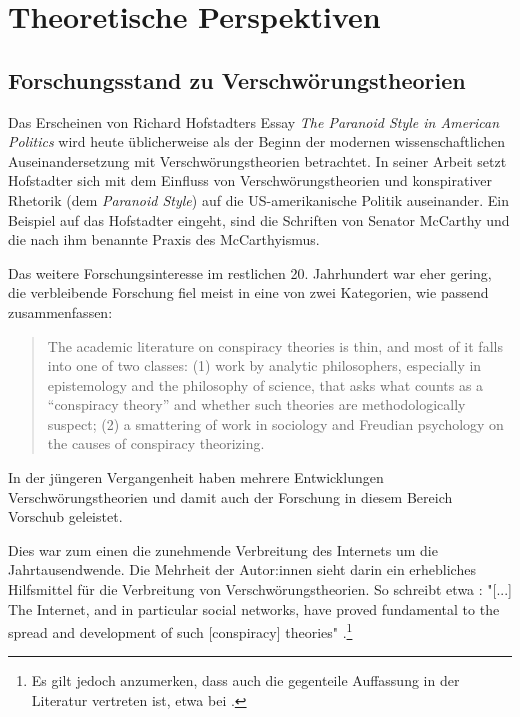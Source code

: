 \section{Theoretische Perspektiven}

\subsection{Forschungsstand zu Verschwörungstheorien}

Das Erscheinen von Richard Hofstadters Essay \textit{The Paranoid Style in American Politics} \parencite[][]{hofstadter_2008} wird heute üblicherweise als der Beginn der modernen wissenschaftlichen Auseinandersetzung mit Verschwörungstheorien betrachtet.
In seiner Arbeit setzt Hofstadter sich mit dem Einfluss von Verschwörungstheorien und konspirativer Rhetorik (dem \textit{Paranoid Style}) auf die US-amerikanische Politik auseinander.
Ein Beispiel auf das Hofstadter eingeht, sind die Schriften von Senator McCarthy und die nach ihm benannte Praxis des McCarthyismus.

Das weitere Forschungsinteresse im restlichen 20. Jahrhundert war eher gering, die verbleibende Forschung fiel meist in eine von zwei Kategorien, wie \textcite{sunstein_2008} passend zusammenfassen:

\begin{quotation}
    The academic literature on conspiracy theories is thin, and most of it falls into one 
    of two classes: (1) work by analytic philosophers, especially in epistemology and the 
    philosophy of science, that asks what counts as a “conspiracy theory” and whether such theories are methodologically suspect; (2) a smattering of work in sociology and Freudian psychology on the causes of conspiracy theorizing. \parencite[][2]{sunstein_2008}
\end{quotation}

In der jüngeren Vergangenheit haben mehrere Entwicklungen Verschwörungstheorien und damit auch der Forschung in diesem Bereich Vorschub geleistet.

Dies war zum einen die zunehmende Verbreitung des Internets um die Jahrtausendwende.
Die Mehrheit der Autor:innen sieht darin ein erhebliches Hilfsmittel für die Verbreitung von Verschwörungstheorien.
So schreibt etwa \textcite{stano_2020}: "[...] The Internet, and in particular social networks, have proved fundamental to the spread and development of such [conspiracy] theories" \parencite[][492]{stano_2020}.\footnote{Es gilt jedoch anzumerken, dass auch die gegenteile Auffassung in der Literatur vertreten ist, etwa bei \textcite{clarke_2007}.}

